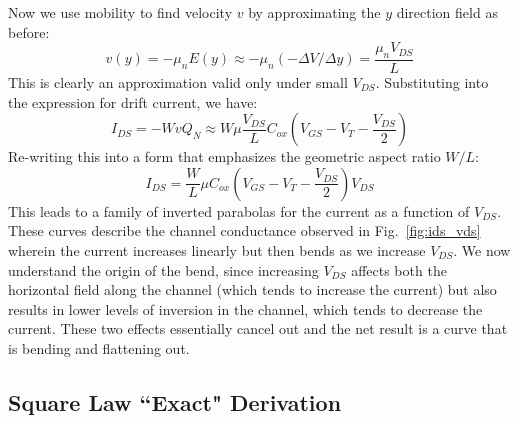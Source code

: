 Now we use mobility to find velocity $v$ by approximating the $y$ direction field as before:
%
\begin{equation}
	v(y) =  - {\mu _n}E(y) \approx  - {\mu _n}( - \Delta V/\Delta y) = \frac{{{\mu _n}{V_{DS}}}}{L}
\end{equation}
%
This is clearly an approximation valid only under small $V_{DS}$.  Substituting into the expression for drift current, we have:
%
\begin{equation}
	I_{DS} =  - Wv{Q_N} \approx W\mu \frac{{{V_{DS}}}}{L}{C_{ox}}({V_{GS}} - {V_T} - \frac{{{V_{DS}}}}{2})
\end{equation}
%
Re-writing this into a form that emphasizes the geometric aspect ratio $W/L$:
\begin{equation}
	I_{DS} = \frac{W}{L}\mu {C_{ox}}({V_{GS}} - {V_T} - \frac{{{V_{DS}}}}{2}){V_{DS}}
\end{equation}
%
This leads to a family of inverted parabolas for the current as a function of $V_{DS}$.  These curves describe the channel conductance observed in Fig.~\ref{fig:ids_vds} wherein the current increases linearly but then bends as we increase $V_{DS}$.  We now understand the origin of the bend, since increasing $V_{DS}$ affects both the horizontal field along the channel (which tends to increase the current) but also results in lower levels of inversion in the channel, which tends to decrease the current.  These two effects essentially cancel out and the net result is a curve that is bending and flattening out.
 


\subsection{Square Law ``Exact" Derivation}

